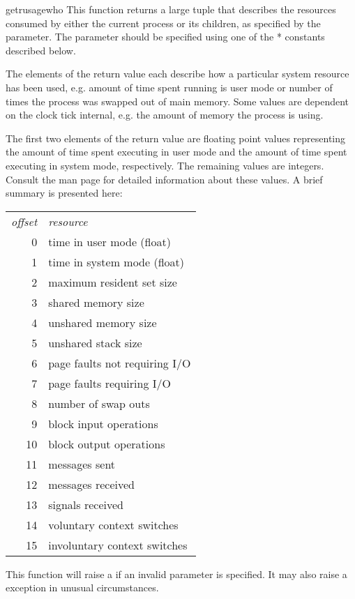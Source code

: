 \begin{funcdesc}{getrusage}{who}
  This function returns a large tuple that describes the resources
  consumed by either the current process or its children, as specified
  by the  parameter.  The  parameter should be
  specified using one of the * constants described
  below.

  The elements of the return value each
  describe how a particular system resource has been used, e.g. amount
  of time spent running is user mode or number of times the process was
  swapped out of main memory. Some values are dependent on the clock
  tick internal, e.g. the amount of memory the process is using.

  The first two elements of the return value are floating point values
  representing the amount of time spent executing in user mode and the
  amount of time spent executing in system mode, respectively. The
  remaining values are integers. Consult the  man page
  for detailed information about these values. A brief summary is
  presented here:

\begin{tabular}{rl}
	\emph{offset} &	\emph{resource} \\
	0  &	time in user mode (float) \\
	1  &	time in system mode (float) \\
	2  &	maximum resident set size \\
	3  &	shared memory size \\
	4  &	unshared memory size \\
	5  &	unshared stack size \\
	6  &	page faults not requiring I/O \\
	7  &	page faults requiring I/O \\
	8  &	number of swap outs \\
	9  &	block input operations \\
	10 &	block output operations \\
	11 &	messages sent \\
	12 &	messages received \\
	13 &	signals received \\
	14 &	voluntary context switches \\
	15 &	involuntary context switches \\
\end{tabular}

  This function will raise a  if an invalid 
  parameter is specified. It may also raise a 
  exception in unusual circumstances.
\end{funcdesc}

